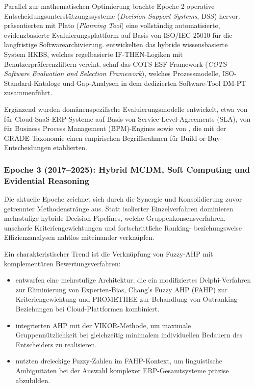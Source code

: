 Parallel zur mathematischen Optimierung brachte Epoche 2 operative Entscheidungsunterstützungssysteme (\textit{Decision Support Systems}, DSS) hervor. \cite{8VHUMEKY} präsentierten mit Plato (\textit{Planning Tool}) eine vollständig automatisierte, evidenzbasierte Evaluierungsplattform auf Basis von ISO/IEC 25010 für die langfristige Softwarearchivierung. \cite{U4E7VXQU} entwickelten das hybride wissensbasierte System HKBS, welches regelbasierte IF-THEN-Logiken mit Benutzerpräferenzfiltern vereint. \cite{WZM7DUBY} schuf das COTS-ESF-Framework (\textit{COTS Software Evaluation and Selection Framework}), welches Prozessmodelle, ISO-Standard-Kataloge und Gap-Analysen in dem dedizierten Software-Tool DM-PT zusammenführt.

Ergänzend wurden domänenspezifische Evaluierungsmodelle entwickelt, etwa von \cite{W8P543Y2} für Cloud-SaaS-ERP-Systeme auf Basis von Service-Level-Agreements (SLA), von \cite{LYMHTPXS} für Business Process Management (BPM)-Engines sowie von \cite{JT5X3FIG}, die mit der GRADE-Taxonomie einen empirischen Begriffsrahmen für Build-or-Buy-Entscheidungen etablierten.

\subsubsection{Epoche 3 (2017--2025): Hybrid MCDM, Soft Computing und Evidential Reasoning}

Die aktuelle Epoche zeichnet sich durch die Synergie und Konsolidierung zuvor getrennter Methodenstränge aus. Statt isolierter Einzelverfahren dominieren mehrstufige hybride Decision-Pipelines, welche Gruppenkonsensverfahren, unscharfe Kriteriengewichtungen und fortschrittliche Ranking- beziehungsweise Effizienzanalysen nahtlos miteinander verknüpfen.

Ein charakteristischer Trend ist die Verknüpfung von Fuzzy-AHP mit komplementären Bewertungsverfahren:
\begin{itemize}
    \item \cite{NZJEEPAC} entwarfen eine mehrstufige Architektur, die ein modifiziertes Delphi-Verfahren zur Eliminierung von Experten-Bias, Chang's Fuzzy AHP (FAHP) zur Kriteriengewichtung und PROMETHEE zur Behandlung von Outranking-Beziehungen bei Cloud-Plattformen kombiniert.
    \item \cite{QNWK8SAP} integrierten AHP mit der VIKOR-Methode, um maximale Gruppennützlichkeit bei gleichzeitig minimalem individuellen Bedauern des Entscheiders zu realisieren.
    \item \cite{5BBYQCJB} nutzten dreieckige Fuzzy-Zahlen im FAHP-Kontext, um linguistische Ambiguitäten bei der Auswahl komplexer ERP-Gesamtsysteme präzise abzubilden.
\end{itemize}

